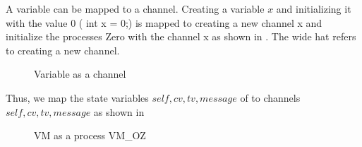 A variable can be mapped to a channel. Creating a variable $x$ and initializing it with the value $0$ ( int x = 0;) is mapped to creating a new channel x and initialize the processes Zero with the channel x
as shown in . The wide hat refers to creating a new channel.
\begin{figure}[H]%
\centering
{}%
\hspace{1em}%
%
\caption{Variable as a channel}
\label{tra_var}%
\end{figure}

Thus, we map the state variables $self, cv, tv, message$ of  to \picalc{} channels $self, cv, tv, message$ as shown in 

\begin{figure}[H]
\centering
{}
\caption{VM as a \picalc{} process VM\_OZ}
\label{tra_var2}
\end{figure}